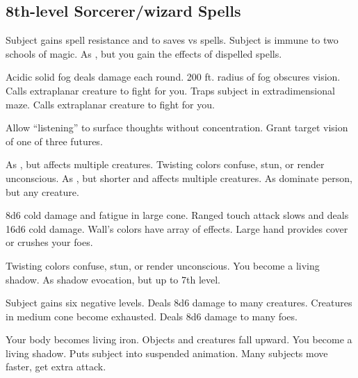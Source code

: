 \subsection{8th-level Sorcerer/wizard Spells} 
\begin{swspelllist}
  \M\F Subject gains spell resistance and  to saves vs spells.
   Subject is immune to two schools of magic.
   As , but you gain the effects of dispelled spells.

   Acidic solid fog deals damage each round.
   200 ft. radius of fog obscures vision.
   Calls extraplanar creature to fight for you.
   Traps subject in extradimensional maze.
   Calls extraplanar creature to fight for you.

   Allow ``listening'' to surface thoughts without concentration.
   Grant target vision of one of three futures.

   As , but affects multiple creatures.
   Twisting colors confuse, stun, or render unconscious.
   As , but shorter and affects multiple creatures.
   As dominate person, but any creature.

   8d6 cold damage and fatigue in large cone.
   Ranged touch attack slows and deals 16d6 cold damage.
   Wall's colors have array of effects.
   Large hand provides cover or crushes your foes.

   Twisting colors confuse, stun, or render unconscious.
   You become a living shadow.
   As shadow evocation, but up to 7th level.

   Subject gains six negative levels.
   Deals 8d6 damage to many creatures.
   Creatures in medium cone become exhausted.
   Deals 8d6 damage to many foes.

   Your body becomes living iron.
   Objects and creatures fall upward.
   You become a living shadow.
  \M Puts subject into suspended animation.
   Many subjects move faster, get extra attack.
\end{swspelllist}

